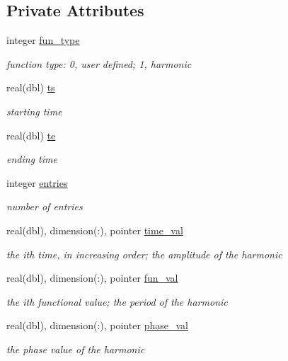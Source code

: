 \subsection*{Private Attributes}
\begin{DoxyCompactItemize}
\item 
integer \hyperlink{structtimefunctionmodule_1_1timefunction_acd580915b25f29aa47c58467c394d2f4}{fun\+\_\+type}
\begin{DoxyCompactList}\small\item\em function type\+: 0, user defined; 1, harmonic \end{DoxyCompactList}\item 
real(dbl) \hyperlink{structtimefunctionmodule_1_1timefunction_a62e761e489833d17dcd1dbcac5c1dfd6}{ts}
\begin{DoxyCompactList}\small\item\em starting time \end{DoxyCompactList}\item 
real(dbl) \hyperlink{structtimefunctionmodule_1_1timefunction_a4378638965011462c9fd4a912f6dc8fd}{te}
\begin{DoxyCompactList}\small\item\em ending time \end{DoxyCompactList}\item 
integer \hyperlink{structtimefunctionmodule_1_1timefunction_a0f07f62ccbe6c9bcc7d9418b4157b234}{entries}
\begin{DoxyCompactList}\small\item\em number of entries \end{DoxyCompactList}\item 
real(dbl), dimension(\+:), pointer \hyperlink{structtimefunctionmodule_1_1timefunction_abad80cdb684de5f31a51015b9d88751f}{time\+\_\+val}
\begin{DoxyCompactList}\small\item\em the ith time, in increasing order; the amplitude of the harmonic \end{DoxyCompactList}\item 
real(dbl), dimension(\+:), pointer \hyperlink{structtimefunctionmodule_1_1timefunction_a7d1b3a0f76df56f38891ba45d161ca9d}{fun\+\_\+val}
\begin{DoxyCompactList}\small\item\em the ith functional value; the period of the harmonic \end{DoxyCompactList}\item 
real(dbl), dimension(\+:), pointer \hyperlink{structtimefunctionmodule_1_1timefunction_a0f4fd140ac6990ddc82b4129b23cfa08}{phase\+\_\+val}
\begin{DoxyCompactList}\small\item\em the phase value of the harmonic \end{DoxyCompactList}\end{DoxyCompactItemize}


